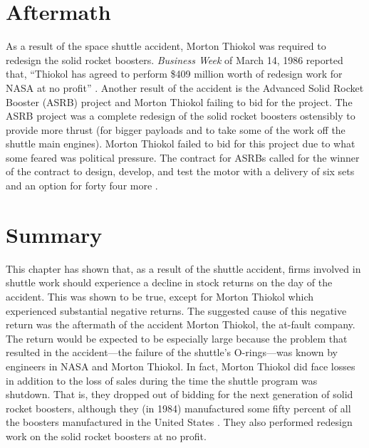 \section{Aftermath}

As a result of the space shuttle accident, Morton Thiokol was required to redesign the solid rocket boosters. {\em Business Week} of March 14, 1986 reported that, ``Thiokol has agreed to perform \$409 million worth of redesign work for NASA at no profit'' \cite[p. 91]{bw}. Another result of the accident is the Advanced Solid Rocket Booster (ASRB) project and Morton Thiokol failing to bid for the project. The ASRB project was a complete redesign of the solid rocket boosters ostensibly to provide more thrust (for bigger payloads and to take some of the work off the shuttle main engines). Morton Thiokol failed to bid for this project due to what some feared was political pressure. The contract for ASRBs called for the winner of the contract to design, develop, and test the motor with a delivery of six sets and an option for forty four more \cite[p. 13]{gao89}.

\section{Summary}

This chapter has shown that, as a result of the shuttle accident, firms involved in shuttle work should experience a decline in stock returns on the day of the accident. This was shown to be true, except for Morton Thiokol which experienced substantial negative returns. The suggested cause of this negative return was the aftermath of the accident Morton Thiokol, the at-fault company. The return would be expected to be especially large because the problem that resulted in the accident---the failure of the shuttle's O-rings---was known by engineers in NASA and Morton Thiokol. In fact, Morton Thiokol did face losses in addition to the loss of sales during the time the shuttle program was shutdown. That is, they dropped out of bidding for the next generation of solid rocket boosters, although they (in 1984) manufactured some fifty percent of all the boosters manufactured in the United States \cite[p. 18]{gao86}. They also performed redesign work on the solid rocket boosters at no profit.

